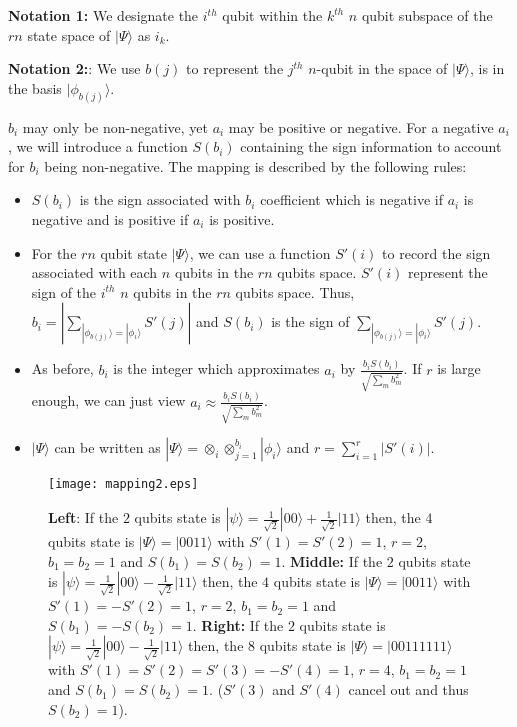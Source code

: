 \documentclass{article}
\begin{document}
{\bf Notation 1:} We designate the $i^{th}$ qubit within the $k^{th}$ $n$ qubit subspace of the $rn$ state space of $|\Psi\rangle$ as $i_k$. 

{\bf Notation 2:}: We use $b(j)$ to represent the $j^{th}$ $n$-qubit in the space of $|\Psi\rangle$, is in the basis $|\phi_{b(j)}\rangle$.

$b_i$ may only be non-negative, yet $a_i$ may be positive or negative. For a negative 
$a_i$, we will introduce a function $S(b_i)$  containing the sign information to account for $b_i$ being non-negative.  The mapping is described by the following rules:
\begin{itemize}
\item $S(b_i)$ is the sign associated with $b_i$ coefficient which is negative if $a_i$ is negative and is positive if $a_i$ is positive.
\item For the $rn$ qubit state $|\Psi\rangle$, we can use a function $S'(i)$ to record the sign associated with each $n$ qubits in the $rn$ qubits space. $S'(i)$ represent the sign of the $i^{th}$ $n$ qubits in the $rn$ qubits space. Thus, $b_i=|\sum_{|\phi_{b(j)}\rangle=|\phi_i\rangle}S'(j)|$ and $S(b_i)$ is the sign of $\sum_{|\phi_{b(j)}\rangle=|\phi_i\rangle}S'(j)$.
\item As before, $b_i$ is the integer which approximates $a_i$ by $\frac{b_iS(b_i)}{\sqrt{\sum_mb_m^2}}$. If $r$ is large enough, we can just view $a_i \approx \frac{b_iS(b_i)}{\sqrt{\sum_m b_m^2}}$. 
\item $|\Psi\rangle$ can be written as $|\Psi\rangle=\otimes_i\otimes_{j=1}^{b_i}|\phi_i\rangle$ and $r=\sum_{i=1}^{r}|S'(i)|$.
\end{itemize}

\begin{figure}
\begin{center}
\texttt{[image: mapping2.eps]}
\caption{
{\bf Left}: If the $2$ qubits state is $|\psi\rangle =\frac{1}{\sqrt{2}}|00\rangle+\frac{1}{\sqrt{2}}|11\rangle$ then, the $4$ qubits state is $|\Psi\rangle =|0011\rangle$ with $S'(1)=S'(2)=1$, $r=2$, $b_1=b_2=1$ and $S(b_1)=S(b_2)=1$.
{\bf Middle:} If the $2$ qubits state is $|\psi\rangle =\frac{1}{\sqrt{2}}|00\rangle-\frac{1}{\sqrt{2}}|11\rangle$ then, the $4$ qubits state is $|\Psi\rangle =|0011\rangle$ with $S'(1)=-S'(2)=1$, $r=2$, $b_1=b_2=1$ and $S(b_1)=-S(b_2)=1$.
{\bf Right:} If the $2$ qubits state is $|\psi\rangle =\frac{1}{\sqrt{2}}|00\rangle-\frac{1}{\sqrt{2}}|11\rangle$ then, the $8$ qubits state is $|\Psi\rangle= |00111111\rangle$ with $S'(1)=S'(2)=S'(3)=-S'(4)=1$, $r=4$, $b_1=b_2=1$ and $S(b_1)=S(b_2)=1$. ($S'(3)$ and $S'(4)$ cancel out and thus $S(b_2)=1$).}
\end{center}
\end{figure}
\end{document}
